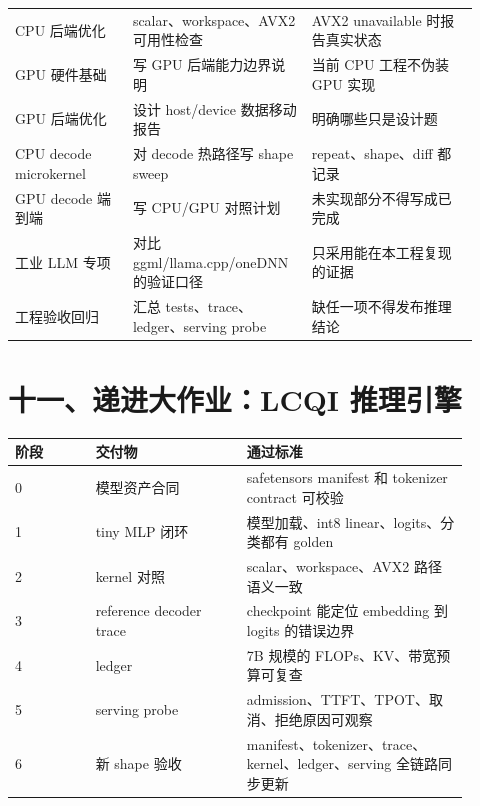 \begin{longtable}{p{0.24\linewidth}p{0.34\linewidth}p{0.34\linewidth}}
CPU 后端优化 & scalar、workspace、AVX2 可用性检查 & AVX2 unavailable 时报告真实状态 \\
GPU 硬件基础 & 写 GPU 后端能力边界说明 & 当前 CPU 工程不伪装 GPU 实现 \\
GPU 后端优化 & 设计 host/device 数据移动报告 & 明确哪些只是设计题 \\
CPU decode microkernel & 对 decode 热路径写 shape sweep & repeat、shape、diff 都记录 \\
GPU decode 端到端 & 写 CPU/GPU 对照计划 & 未实现部分不得写成已完成 \\
工业 LLM 专项 & 对比 ggml/llama.cpp/oneDNN 的验证口径 & 只采用能在本工程复现的证据 \\
工程验收回归 & 汇总 tests、trace、ledger、serving probe & 缺任一项不得发布推理结论 \\
\end{longtable}

\section{十一、递进大作业：LCQI 推理引擎}

\begin{longtable}{p{0.16\linewidth}p{0.30\linewidth}p{0.44\linewidth}}
阶段 & 交付物 & 通过标准 \\
\hline
0 & 模型资产合同 & safetensors manifest 和 tokenizer contract 可校验 \\
1 & tiny MLP 闭环 & 模型加载、int8 linear、logits、分类都有 golden \\
2 & kernel 对照 & scalar、workspace、AVX2 路径语义一致 \\
3 & reference decoder trace & checkpoint 能定位 embedding 到 logits 的错误边界 \\
4 & ledger & 7B 规模的 FLOPs、KV、带宽预算可复查 \\
5 & serving probe & admission、TTFT、TPOT、取消、拒绝原因可观察 \\
6 & 新 shape 验收 & manifest、tokenizer、trace、kernel、ledger、serving 全链路同步更新 \\
\end{longtable}
